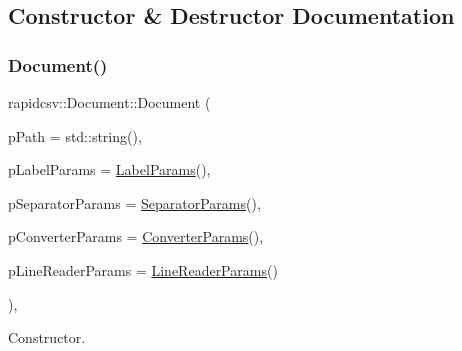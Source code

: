 \subsection{Constructor \& Destructor Documentation}
\mbox{\label{classrapidcsv_1_1Document_a3c8a1c6cc0deeb5e57f0db75ccb52878}} 
\subsubsection{\texorpdfstring{Document()}{Document()}\hspace{0.1cm}{\footnotesize\ttfamily [1/2]}}
{\footnotesize\ttfamily rapidcsv\+::\+Document\+::\+Document (\begin{DoxyParamCaption}\item[{const std\+::string \&}]{p\+Path = {\ttfamily std\+:\+:string()},  }\item[{const \hyperlink{structrapidcsv_1_1LabelParams}{Label\+Params} \&}]{p\+Label\+Params = {\ttfamily \hyperlink{structrapidcsv_1_1LabelParams}{Label\+Params}()},  }\item[{const \hyperlink{structrapidcsv_1_1SeparatorParams}{Separator\+Params} \&}]{p\+Separator\+Params = {\ttfamily \hyperlink{structrapidcsv_1_1SeparatorParams}{Separator\+Params}()},  }\item[{const \hyperlink{structrapidcsv_1_1ConverterParams}{Converter\+Params} \&}]{p\+Converter\+Params = {\ttfamily \hyperlink{structrapidcsv_1_1ConverterParams}{Converter\+Params}()},  }\item[{const \hyperlink{structrapidcsv_1_1LineReaderParams}{Line\+Reader\+Params} \&}]{p\+Line\+Reader\+Params = {\ttfamily \hyperlink{structrapidcsv_1_1LineReaderParams}{Line\+Reader\+Params}()} }\end{DoxyParamCaption})\hspace{0.3cm}{\ttfamily [inline]}, {\ttfamily [explicit]}}



Constructor. 


